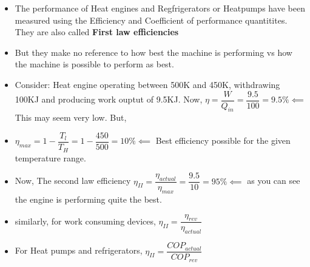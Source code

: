 \documentclass[8pt]{article}
\begin{document}
	\begin{itemize}
		\item The performance of Heat engines and Regfrigerators or Heatpumps have been measured using the Efficiency and Coefficient of performance quantitites. They are also called \textbf{First law efficiencies}
		\item But they make no reference to how best the machine is performing vs how the machine is possible to perform as best.
		\item Consider: Heat engine operating between 500K and 450K, withdrawing 100KJ and producing work ouptut of 9.5KJ. Now, $\eta = \dfrac{W}{Q_{in}} = \dfrac{9.5}{100} = 9.5\% \impliedby$ This may seem very low. But, 
		\item $\eta_{max} = 1-\dfrac{T_l}{T_H} = 1-\dfrac{450}{500} = 10\% \impliedby$ Best efficiency possible for the given temperature range. 
		\item Now, The second law efficiency $\boxed{\eta_{II} = \dfrac{\eta_{actual}}{\eta_{max}}} = \dfrac{9.5}{10} = 95\% \impliedby$ as you can see the engine is performing quite the best. 
		\item similarly, for work consuming devices, $\boxed{\eta_{II}=\dfrac{\eta_{rev}}{\eta_{actual}}}$
		\item For Heat pumps and refrigerators, $\boxed{\eta_{II}=\dfrac{COP_{actual}}{COP_{rev}}}$
	\end{itemize}		
\end{document}
